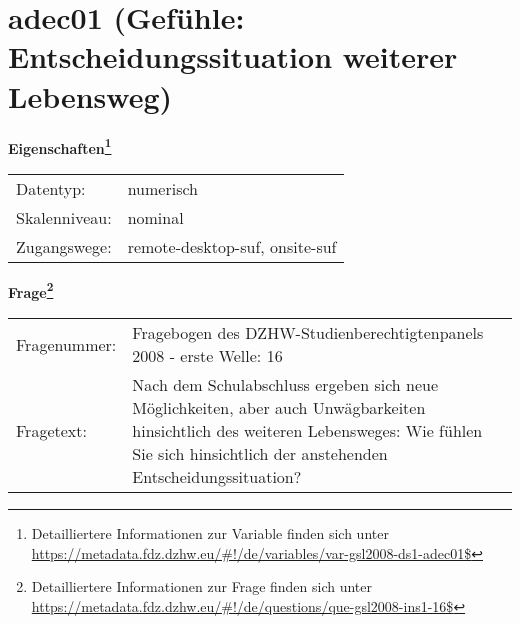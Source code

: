 
    \setcounter{footnote}{0}

    \vspace*{-1.8cm}
	\section{adec01 (Gefühle: Entscheidungssituation weiterer Lebensweg)}
	\label{section:adec01}



    \vspace*{0.5cm}
    \noindent\textbf{Eigenschaften\footnote{Detailliertere Informationen zur Variable finden sich unter
		\url{https://metadata.fdz.dzhw.eu/\#!/de/variables/var-gsl2008-ds1-adec01$}}}\\
	\begin{tabularx}{\hsize}{@{}lX}
	Datentyp: & numerisch \\
	Skalenniveau: & nominal \\
	Zugangswege: &
	  remote-desktop-suf, 
	  onsite-suf
 \\
    \end{tabularx}



				\vspace*{0.5cm}
                \noindent\textbf{Frage\footnote{Detailliertere Informationen zur Frage finden sich unter
		              \url{https://metadata.fdz.dzhw.eu/\#!/de/questions/que-gsl2008-ins1-16$}}}\\
				\begin{tabularx}{\hsize}{@{}lX}
					Fragenummer: &
					  Fragebogen des DZHW-Studienberechtigtenpanels 2008 - erste Welle:
					  16
 \\
					Fragetext: & Nach dem Schulabschluss ergeben sich neue Möglichkeiten, aber auch Unwägbarkeiten hinsichtlich des weiteren Lebensweges: Wie fühlen Sie sich hinsichtlich der anstehenden Entscheidungssituation? \\
				\end{tabularx}






